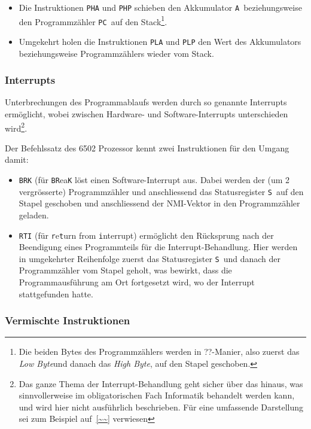 \documentclass[11pt]{scrartcl}
\newcommand{\acc}{\texttt{A}}
\newcommand{\sreg}{\texttt{S}}
\newcommand{\pc}{\texttt{PC}}
\newcommand{\lobyte}{\emph{Low Byte}}
\newcommand{\hibyte}{\emph{High Byte}}
\begin{document}
\begin{itemize}
\item Die Instruktionen \lstinline|PHA| und \lstinline|PHP| schieben
  den Akkumulator \acc\ beziehungsweise den Programmzähler \pc\ auf
  den Stack\footnote{Die beiden Bytes des Programmzählers werden in
    ??-Manier, also zuerst das \lobyte und danach das \hibyte, auf den
    Stapel geschoben.}.
\item Umgekehrt holen die Instruktionen \lstinline|PLA| und
  \lstinline|PLP| den Wert des Akkumulators beziehungsweise
  Programmzählers wieder vom Stack.
\end{itemize}

\subsubsection{Interrupts}
\label{sec:interrupts}

Unterbrechungen des Programmablaufs werden durch so genannte
Interrupts ermöglicht, wobei zwischen Hardware- und
Software-Interrupts unterschieden wird\footnote{Das ganze Thema der
  Interrupt-Behandlung geht sicher über das hinaus, was sinnvollerweise
  im obligatorischen Fach Informatik behandelt werden kann, und wird
  hier nicht ausführlich beschrieben. Für eine umfassende Darstellung
  sei zum Beispiel auf~\ref{~~} verwiesen}.

Der Befehlssatz des 6502 Prozessor kennt zwei Instruktionen für den
Umgang damit:

\begin{itemize}
\item \lstinline|BRK| (für \texttt{BR}ea\texttt{K} löst einen
  Software-Interrupt aus. Dabei werden der (um 2 vergrösserte)
  Programmzähler und anschliessend das Statusregister \sreg\ auf den
  Stapel geschoben und anschliessend der NMI-Vektor in den
  Programmzähler geladen.

\item \lstinline|RTI| (für \texttt{r}e\texttt{t}urn from
  \texttt{i}nterrupt) ermöglicht den Rücksprung nach der Beendigung
  eines Programmteils für die Interrupt-Behandlung. Hier werden in
  umgekehrter Reihenfolge zuerst das Statusregister \sreg\ und danach
  der Programmzähler vom Stapel geholt, was bewirkt, dass die
  Programmausführung am Ort fortgesetzt wird, wo der Interrupt  stattgefunden hatte.
\end{itemize}

\subsubsection{Vermischte Instruktionen}
\label{sec:misc_instructions}
\end{document}
